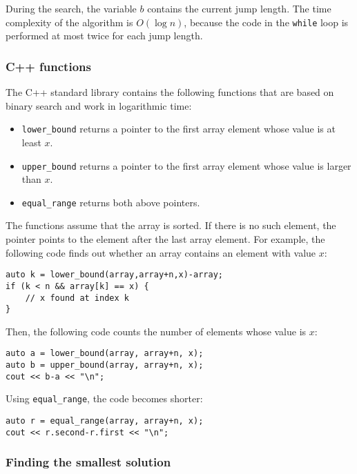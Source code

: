 During the search, the variable $b$
contains the current jump length.
The time complexity of the algorithm is $O(\log n)$,
because the code in the \texttt{while} loop
is performed at most twice for each jump length.

\subsubsection{C++ functions}

The C++ standard library contains the following functions
that are based on binary search and work in logarithmic time:

\begin{itemize}
\item \texttt{lower\_bound} returns a pointer to the
first array element whose value is at least $x$.
\item \texttt{upper\_bound} returns a pointer to the
first array element whose value is larger than $x$.
\item \texttt{equal\_range} returns both above pointers.
\end{itemize}

The functions assume that the array is sorted.
If there is no such element, the pointer points to
the element after the last array element.
For example, the following code finds out whether
an array contains an element with value $x$:

\begin{lstlisting}
auto k = lower_bound(array,array+n,x)-array;
if (k < n && array[k] == x) {
    // x found at index k
}
\end{lstlisting}

Then, the following code counts the number of elements
whose value is $x$:

\begin{lstlisting}
auto a = lower_bound(array, array+n, x);
auto b = upper_bound(array, array+n, x);
cout << b-a << "\n";
\end{lstlisting}

Using \texttt{equal\_range}, the code becomes shorter:

\begin{lstlisting}
auto r = equal_range(array, array+n, x);
cout << r.second-r.first << "\n";
\end{lstlisting}

\subsubsection{Finding the smallest solution}

